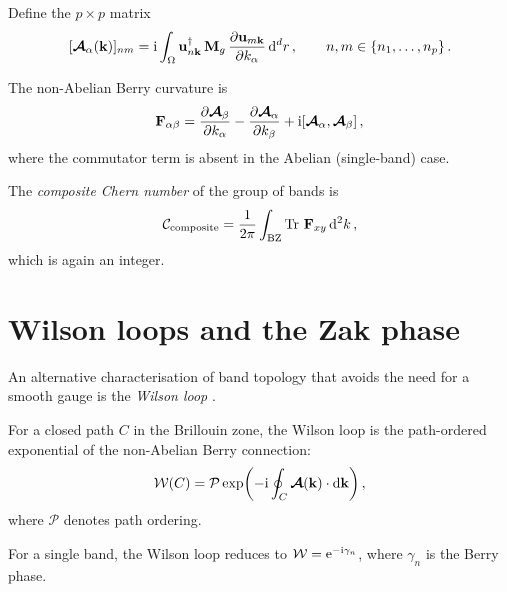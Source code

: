 \begin{definition}
  Define the $p\times p$ matrix
  \begin{equation}\label{eq:ch5-non-abelian-connection}
    [\boldsymbol{\mathcal{A}}_\alpha(\mathbf{k})]_{nm}
    = \mathrm{i}\int_\Omega
    \mathbf{u}_{n\mathbf{k}}^\dagger\,\mathbf{M}_g\,
    \frac{\partial \mathbf{u}_{m\mathbf{k}}}{\partial k_\alpha}\,\mathrm{d}^d r\,,
    \qquad n,m\in\{n_1,\ldots,n_p\}\,.
  \end{equation}
\end{definition}

The non-Abelian Berry curvature is
\begin{equation}\label{eq:ch5-non-abelian-curvature}
  \mathbf{F}_{\alpha\beta}
  = \frac{\partial \boldsymbol{\mathcal{A}}_\beta}{\partial k_\alpha}
  - \frac{\partial \boldsymbol{\mathcal{A}}_\alpha}{\partial k_\beta}
  + \mathrm{i}[\boldsymbol{\mathcal{A}}_\alpha,
       \boldsymbol{\mathcal{A}}_\beta]\,,
\end{equation}
where the commutator term is absent in the Abelian (single-band) case.

The \emph{composite Chern number} of the group of bands is
\begin{equation}\label{eq:ch5-composite-chern}
  \mathcal{C}_{\mathrm{composite}}
  = \frac{1}{2\pi}\int_{\mathrm{BZ}} \operatorname{Tr}\,\mathbf{F}_{xy}\,\mathrm{d}^2 k\,,
\end{equation}
which is again an integer.

\section{Wilson loops and the Zak phase}
\label{sec:ch5-wilson}

An alternative characterisation of band topology that avoids the need
for a smooth gauge is the \emph{Wilson loop}
\cite{lu2026universal,hsieh2008topological,atala2013direct}.

\begin{definition}
  For a closed path $C$ in the Brillouin zone, the Wilson loop is the
  path-ordered exponential of the non-Abelian Berry connection:
  \begin{equation}\label{eq:ch5-wilson-loop}
    \mathcal{W}(C) = \mathcal{P}\exp\biggl(
      -\mathrm{i}\oint_C \boldsymbol{\mathcal{A}}(\mathbf{k})\cdot\mathrm{d}\mathbf{k}
    \biggr)\,,
  \end{equation}
  where $\mathcal{P}$ denotes path ordering.
\end{definition}

For a single band, the Wilson loop reduces to
$\mathcal{W}=\mathrm{e}^{-\mathrm{i}\gamma_n}$, where $\gamma_n$ is the Berry phase.

